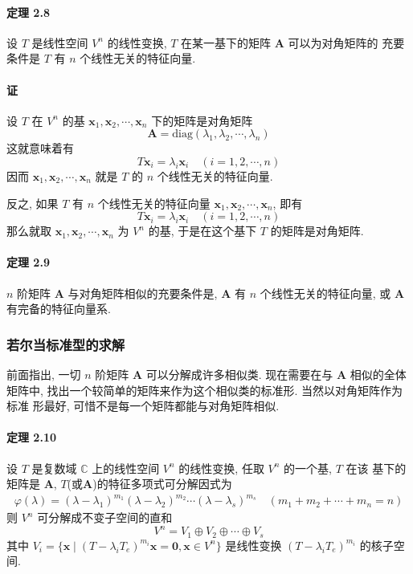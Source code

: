 \paragraph*{定理 2.8} 设 $T$ 是线性空间 $V^n$ 的线性变换, $T$ 在某一基下的矩阵 $\bm{A}$ 可以为对角矩阵的
充要条件是 $T$ 有 $n$ 个线性无关的特征向量.

\paragraph*{证} 设 $T$ 在 $V^n$ 的基 $\bm{x}_1, \bm{x}_2, \cdots, \bm{x}_n$ 下的矩阵是对角矩阵
$$
    \bm{A} = \mathrm{diag}(\lambda_1, \lambda_2, \cdots, \lambda_n)
$$
这就意味着有
$$
    T\bm{x}_i = \lambda_i\bm{x}_i \quad (i = 1, 2, \cdots, n)
$$
因而 $\bm{x}_1, \bm{x}_2, \cdots, \bm{x}_n$ 就是 $T$ 的 $n$ 个线性无关的特征向量.
\par 反之, 如果 $T$ 有 $n$ 个线性无关的特征向量 $\bm{x}_1, \bm{x}_2, \cdots, \bm{x}_n$, 即有
$$
    T\bm{x}_i = \lambda_i\bm{x}_i \quad (i = 1, 2, \cdots, n)
$$
那么就取 $\bm{x}_1, \bm{x}_2, \cdots, \bm{x}_n$ 为 $V^n$ 的基, 于是在这个基下 $T$ 的矩阵是对角矩阵.

\paragraph*{定理 2.9} $n$ 阶矩阵 $\bm{A}$ 与对角矩阵相似的充要条件是, $\bm{A}$ 有 $n$ 个线性无关的特征向量,
或 $\bm{A}$ 有完备的特征向量系.

\subsubsection{若尔当标准型的求解}

\par 前面指出, 一切 $n$ 阶矩阵 $\bm{A}$ 可以分解成许多相似类. 现在需要在与 $\bm{A}$ 相似的全体
矩阵中, 找出一个较简单的矩阵来作为这个相似类的标准形. 当然以对角矩阵作为标准
形最好, 可惜不是每一个矩阵都能与对角矩阵相似.

\paragraph*{定理 2.10} 设 $T$ 是复数域 $\mathbb{C}$ 上的线性空间 $V^n$ 的线性变换, 任取 $V^n$ 的一个基, $T$ 在该
基下的矩阵是 $\bm{A}$, $T$(或$\bm{A}$)的特征多项式可分解因式为
\begin{gather}
    \varphi(\lambda) = (\lambda - \lambda_1)^{m_1}(\lambda - \lambda_2)^{m_2}\cdots(\lambda - \lambda_s)^{m_s} \quad (m_1 + m_2 + \cdots + m_n = n)
    \tag{2.1.8}
\end{gather}
则 $V^n$ 可分解成不变子空间的直和
$$
    V^n = V_1 \oplus V_2 \oplus \cdots \oplus V_s
$$
其中 $V_i = \{\bm{x} \mid (T - \lambda_iT_e)^{m_i}\bm{x} = \bm{0}, \bm{x} \in V^n\}$ 是线性变换 $(T - \lambda_iT_e)^{m_i}$ 的核子空间.

